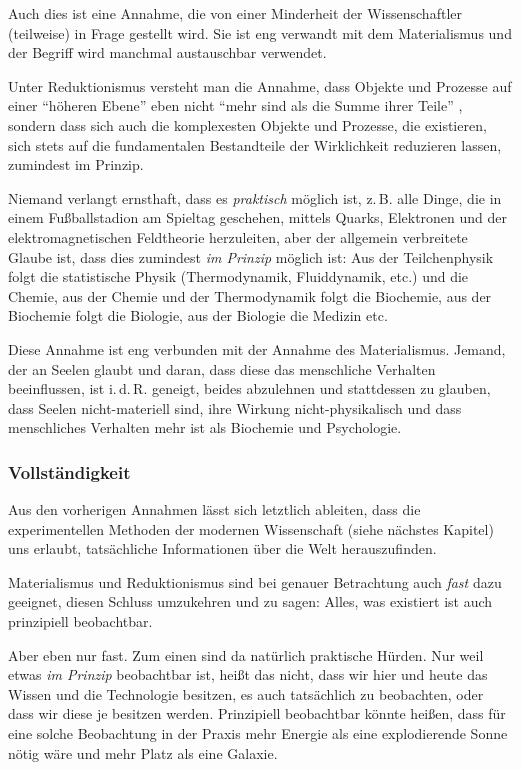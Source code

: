 Auch dies ist eine Annahme, die von einer Minderheit der Wissenschaftler (teilweise) in Frage gestellt wird. Sie ist eng verwandt mit dem Materialismus und der Begriff wird manchmal austauschbar verwendet.

Unter Reduktionismus versteht man die Annahme, dass Objekte und Prozesse auf einer \enquote{höheren Ebene} eben nicht
\enquote{mehr sind als die Summe ihrer Teile}
, sondern dass sich auch die komplexesten Objekte und Prozesse, die existieren, sich stets auf die fundamentalen
Bestandteile der Wirklichkeit reduzieren lassen, zumindest im Prinzip.

Niemand verlangt ernsthaft, dass es \emph{praktisch}
möglich ist, z.\,B. alle Dinge, die in einem Fußballstadion am Spieltag geschehen, mittels Quarks, Elektronen und der
elektromagnetischen Feldtheorie herzuleiten, aber der allgemein verbreitete Glaube ist, dass dies zumindest
\emph{im Prinzip} möglich ist: Aus der Teilchenphysik folgt die statistische Physik (Thermodynamik, Fluiddynamik, etc.) und die Chemie, aus der Chemie und der Thermodynamik folgt die Biochemie, aus der Biochemie folgt die Biologie, aus der Biologie die Medizin etc.

Diese Annahme ist eng verbunden mit der Annahme des Materialismus. Jemand, der an Seelen glaubt und daran, dass diese das menschliche Verhalten beeinflussen, ist i.\,d.\,R. geneigt, beides abzulehnen und stattdessen zu glauben, dass Seelen nicht-materiell sind, ihre Wirkung nicht-physikalisch und dass menschliches Verhalten mehr ist als Biochemie und Psychologie.

\subsubsection{Vollständigkeit}

Aus den vorherigen Annahmen lässt sich letztlich ableiten, dass die experimentellen Methoden der modernen Wissenschaft (siehe nächstes Kapitel) uns erlaubt, tatsächliche Informationen über die Welt herauszufinden.

Materialismus und Reduktionismus sind bei genauer Betrachtung auch \emph{fast} dazu geeignet, diesen Schluss umzukehren und zu sagen: Alles, was existiert ist auch prinzipiell beobachtbar.

Aber eben nur fast. Zum einen sind da natürlich praktische Hürden. Nur weil etwas \emph{im Prinzip} beobachtbar ist, heißt das nicht, dass wir hier und heute das Wissen und die Technologie besitzen, es auch tatsächlich zu beobachten, oder dass wir diese je besitzen werden. Prinzipiell beobachtbar könnte heißen, dass für eine solche Beobachtung in der Praxis mehr Energie als eine explodierende Sonne nötig wäre und mehr Platz als eine Galaxie.

